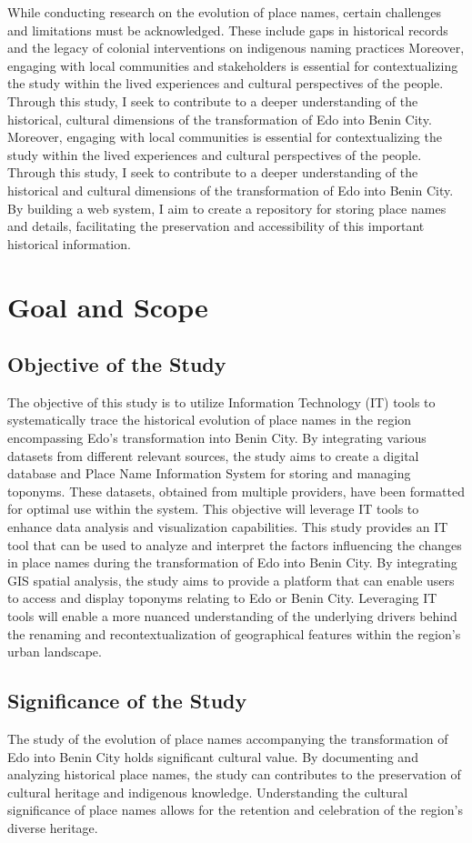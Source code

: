 While conducting research on the evolution of place names, certain challenges and limitations must be acknowledged. These include gaps in historical records and the legacy of colonial interventions on indigenous naming practices Moreover, engaging with local communities and stakeholders is essential for contextualizing the study within the lived experiences and cultural perspectives of the people.
Through this study, I seek to contribute to a deeper understanding of the historical, cultural dimensions of the transformation of Edo into Benin City. Moreover, engaging with local communities is essential for contextualizing the study within the lived experiences and cultural perspectives of the people. Through this study, I seek to contribute to a deeper understanding of the historical and cultural dimensions of the transformation of Edo into Benin City. By building a web system, I aim to create a repository for storing place names and details, facilitating the preservation and accessibility of this important historical information.

\section{Goal and Scope}
\subsection{Objective of the Study}
The objective of this study is to utilize Information Technology (IT) tools to systematically trace the historical evolution of place names in the region encompassing Edo's transformation into Benin City. By integrating various datasets from different relevant sources, the study aims to create a digital database and Place Name Information System for storing and managing toponyms. These datasets, obtained from multiple providers, have been formatted for optimal use within the system. This objective will leverage IT tools to enhance data analysis and visualization capabilities.
This study provides an IT tool that can be used to analyze and interpret the factors influencing the changes in place names during the transformation of Edo into Benin City. By integrating GIS spatial analysis, the study aims to provide a platform that can enable users to access and display toponyms relating to Edo or Benin City. Leveraging IT tools will enable a more nuanced understanding of the underlying drivers behind the renaming and recontextualization of geographical features within the region's urban landscape.
\subsection{Significance of the Study}
The study of the evolution of place names accompanying the transformation of Edo into Benin City holds significant cultural value. By documenting and analyzing historical place names, the study can contributes to the preservation of cultural heritage and indigenous knowledge. Understanding the cultural significance of place names allows for the retention and celebration of the region's diverse heritage. 

